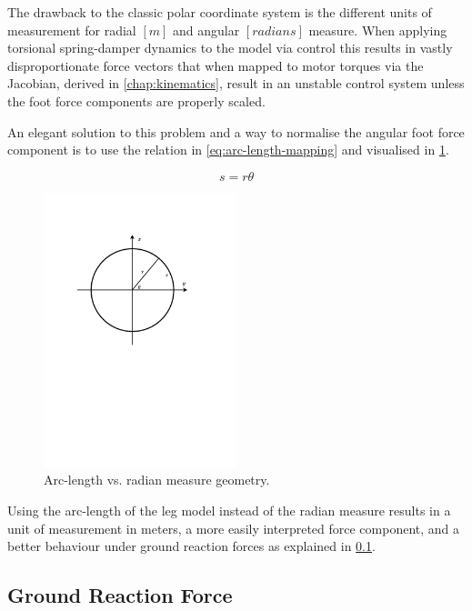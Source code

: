 The drawback to the classic polar coordinate system is the different units of measurement for radial $[m]$ and angular $[radians]$ measure. When applying torsional spring-damper dynamics to the model via control this results in vastly disproportionate force vectors that when mapped to motor torques via the Jacobian, derived in \cref{chap:kinematics}, result in an unstable control system unless the foot force components are properly scaled. 

An elegant solution to this problem and a way to normalise the angular foot force component is to use the relation in \cref{eq:arc-length-mapping} and visualised in \cref{fig:Arc-length vs. radian measure geometry}.

\begin{equation} \label{eq:arc-length-mapping}
s = r \theta
\end{equation}

\begin{figure}
\centering
\includegraphics[clip, trim=2cm 8cm 2cm 2cm, page=1, width=0.5\textwidth]{images/control/arc-length-theta-geometry.pdf} 
\caption{Arc-length vs. radian measure geometry.}
\label{fig:Arc-length vs. radian measure geometry}
\end{figure}

Using the arc-length of the leg model instead of the radian measure results in a unit of measurement in meters, a more easily interpreted force component, and a better behaviour under ground reaction forces as explained in \cref{sec:Ground Reaction Force}. 

\subsection{Ground Reaction Force}
\label{sec:Ground Reaction Force}

